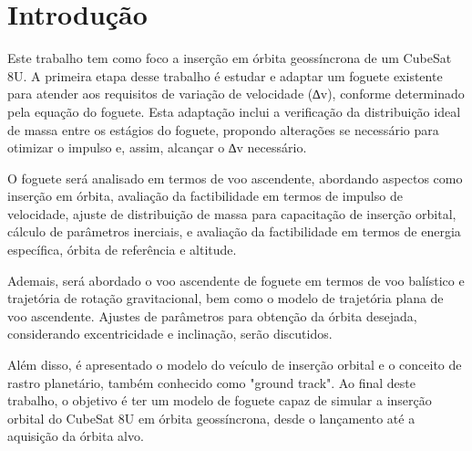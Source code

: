 \chapter{Introdução}

\par Este trabalho tem como foco a inserção em órbita geossíncrona de um CubeSat 8U. A primeira etapa desse trabalho é estudar e adaptar um foguete existente para atender aos requisitos de variação de velocidade (∆v), conforme determinado pela equação do foguete. Esta adaptação inclui a verificação da distribuição ideal de massa entre os estágios do foguete, propondo alterações se necessário para otimizar o impulso e, assim, alcançar o ∆v necessário.

O foguete será analisado em termos de voo ascendente, abordando aspectos como inserção em órbita, avaliação da factibilidade em termos de impulso de velocidade, ajuste de distribuição de massa para capacitação de inserção orbital, cálculo de parâmetros inerciais, e avaliação da factibilidade em termos de energia específica, órbita de referência e altitude.

Ademais, será abordado o voo ascendente de foguete em termos de voo balístico e trajetória de rotação gravitacional, bem como o modelo de trajetória plana de voo ascendente. Ajustes de parâmetros para obtenção da órbita desejada, considerando excentricidade e inclinação, serão discutidos.

Além disso, é apresentado o modelo do veículo de inserção orbital e o conceito de rastro planetário, também conhecido como "ground track". Ao final deste trabalho, o objetivo é ter um modelo de foguete capaz de simular a inserção orbital do CubeSat 8U em órbita geossíncrona, desde o lançamento até a aquisição da órbita alvo.